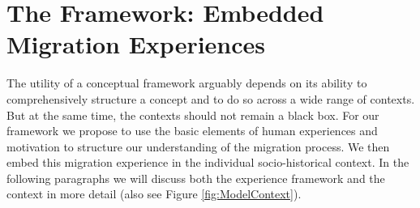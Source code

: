 \documentclass[man, 12pt, a4paper]{apa7}
\begin{document}
\section{The Framework: Embedded Migration Experiences}


The utility of a conceptual framework arguably depends on its ability to comprehensively structure a concept and to do so across a wide range of contexts. But at the same time, the contexts should not remain a black box. 
For our framework we propose to use the basic elements of human experiences and motivation to structure our understanding of the migration process. We then embed this migration experience in the individual socio-historical context. 
In the following paragraphs we will discuss both the experience framework and the context in more detail (also see Figure \ref{fig:ModelContext}).
\end{document}
